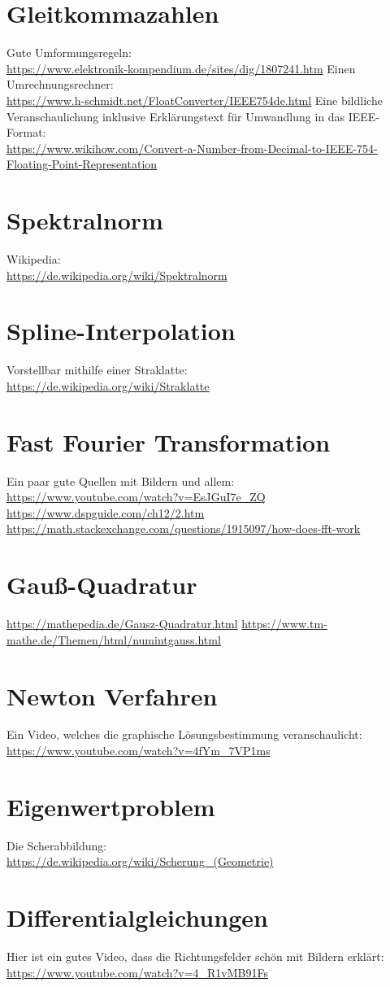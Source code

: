 \documentclass{scrartcl}
\newcommand{\npbase}{../../../}
\begin{document}
	
	
	\newpage
	
	\section{Gleitkommazahlen}
	Gute Umformungsregeln:
	\\ 
	\url{https://www.elektronik-kompendium.de/sites/dig/1807241.htm}
	\n 
	Einen Umrechnungsrechner:
	\\
	\url{https://www.h-schmidt.net/FloatConverter/IEEE754de.html}
	\n 
	Eine bildliche Veranschaulichung inklusive Erklärungstext für Umwandlung in das IEEE-Format:
	\\
	\url{https://www.wikihow.com/Convert-a-Number-from-Decimal-to-IEEE-754-Floating-Point-Representation}
	
	\section{Spektralnorm}
	Wikipedia:
	\\
	\url{https://de.wikipedia.org/wiki/Spektralnorm}
	
	\section{Spline-Interpolation}
	Vorstellbar mithilfe einer Straklatte:
	\\
	\url{https://de.wikipedia.org/wiki/Straklatte}
	
	\section{Fast Fourier Transformation}
	Ein paar gute Quellen mit Bildern und allem: \\
	\url{https://www.youtube.com/watch?v=EsJGuI7e_ZQ} \n
	\url{https://www.dspguide.com/ch12/2.htm}\n
	\url{https://math.stackexchange.com/questions/1915097/how-does-fft-work}
	
	\section{Gauß-Quadratur}
	\url{https://mathepedia.de/Gausz-Quadratur.html}
	\n
	\url{https://www.tm-mathe.de/Themen/html/numintgauss.html} 
	
	\section{Newton Verfahren}
	Ein Video, welches die graphische Lösungsbestimmung veranschaulicht: 
	\\ \url{https://www.youtube.com/watch?v=4fYm_7VP1ms}
	
	\section{Eigenwertproblem}
	Die Scherabbildung: \\
	\url{https://de.wikipedia.org/wiki/Scherung_(Geometrie)}
	
	\section{Differentialgleichungen}
	Hier ist ein gutes Video, dass die Richtungsfelder schön mit Bildern erklärt: \\
	\url{https://www.youtube.com/watch?v=4_R1vMB91Fs}
	
\end{document}
